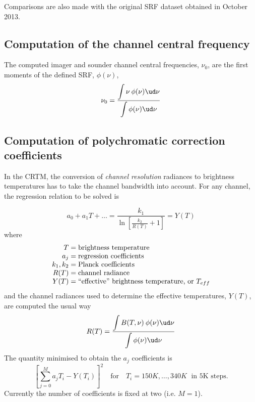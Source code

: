 Comparisons are also made with the original SRF dataset \citep{INSAT3D_SRF_Data} obtained in October 2013.


\subsection{Computation of the channel central frequency}
The computed imager and sounder channel central frequencies, $\nu_0$, are the first moments of the defined SRF, $\phi(\nu)$,
\begin{equation}
  \nu_0 = \frac{\displaystyle\int{\nu\:\phi(\nu)\ud \nu}}{\displaystyle\int{\phi(\nu)\ud \nu}}
\end{equation}


\subsection{Computation of polychromatic correction coefficients}
In the CRTM, the conversion of \emph{channel resolution} radiances to brightness temperatures has to take the channel bandwidth into account. For any channel, the regression relation to be solved is

\begin{equation}
  a_0 + a_1T + \ldots = \frac{\displaystyle k_1}{\displaystyle \ln\left[\frac{k_2}{R(T)}+1\right]} = Y(T)
  \label{eqn:polycorr_regression}
\end{equation}
where
\begin{equation*}
  \begin{array}{r@{\;=\;}l}
         T &\mbox{brightness temperature} \\
        a_j&\mbox{regression coefficients} \\
    k_1,k_2&\mbox{Planck coefficients} \\
       R(T)&\mbox{channel radiance} \\
       Y(T)&\mbox{``effective'' brightness temperature, or $T_{eff}$}
  \end{array}
\end{equation*}
and the channel radiances used to determine the effective temperatures, $Y(T)$, are computed the usual way
\begin{equation}
  R(T) = \frac{\displaystyle\int{B(T,\nu)\:\phi(\nu)\ud \nu}}{\displaystyle\int{\phi(\nu)\ud \nu}}
\end{equation}
The quantity minimised to obtain the $a_j$ coefficients is
\begin{equation}
  \left[ \sum_{j=0}^{M}a_j T_{i} - Y(T_{i}) \right]^2 \quad\mbox{for}\quad T_i = 150K, \ldots, 340K \;\mbox{ in 5K steps.}
\end{equation}
Currently the number of coefficients is fixed at two (i.e. $M=1$).



